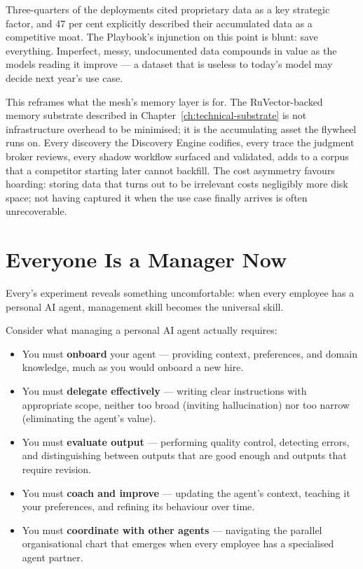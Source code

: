 Three-quarters of the deployments cited proprietary data as a key strategic factor, and 47 per cent explicitly described their accumulated data as a competitive moat. The Playbook's injunction on this point is blunt: save everything. Imperfect, messy, undocumented data compounds in value as the models reading it improve --- a dataset that is useless to today's model may decide next year's use case.

This reframes what the mesh's memory layer is for. The RuVector-backed memory substrate described in Chapter~\ref{ch:technical-substrate} is not infrastructure overhead to be minimised; it is the accumulating asset the flywheel runs on. Every discovery the Discovery Engine codifies, every trace the judgment broker reviews, every shadow workflow surfaced and validated, adds to a corpus that a competitor starting later cannot backfill. The cost asymmetry favours hoarding: storing data that turns out to be irrelevant costs negligibly more disk space; not having captured it when the use case finally arrives is often unrecoverable.

\section{Everyone Is a Manager Now}

Every's experiment reveals something uncomfortable: when every employee has a personal AI agent, management skill becomes the universal skill.

Consider what managing a personal AI agent actually requires:

\begin{itemize}
  \item You must \textbf{onboard} your agent --- providing context, preferences, and domain knowledge, much as you would onboard a new hire.
  \item You must \textbf{delegate effectively} --- writing clear instructions with appropriate scope, neither too broad (inviting hallucination) nor too narrow (eliminating the agent's value).
  \item You must \textbf{evaluate output} --- performing quality control, detecting errors, and distinguishing between outputs that are good enough and outputs that require revision.
  \item You must \textbf{coach and improve} --- updating the agent's context, teaching it your preferences, and refining its behaviour over time.
  \item You must \textbf{coordinate with other agents} --- navigating the parallel organisational chart that emerges when every employee has a specialised agent partner.
\end{itemize}

